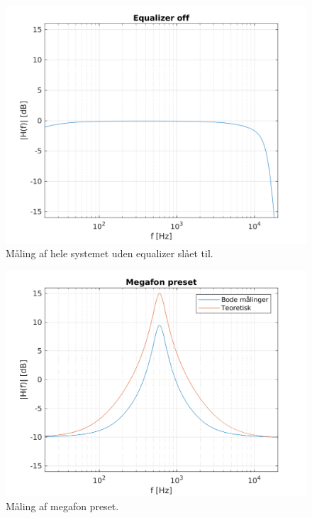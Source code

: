 \begin{figure}[h]
\centering
\includegraphics[]{matlabdemo/test/eq_off.png}  
\caption{Måling af hele systemet uden equalizer slået til.}
\end{figure}

\begin{figure}[h]
\centering
\includegraphics[]{matlabdemo/test/eq_megafon.png}
\caption{Måling af megafon preset.}
\end{figure}

